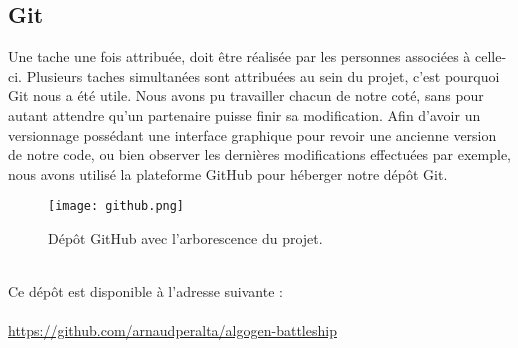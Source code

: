 \documentclass[12pt]{report}
\begin{document}
	\subsection{Git}
	Une tache une fois attribuée, doit être réalisée par les personnes associées à celle-ci. Plusieurs taches simultanées sont attribuées au sein du projet, c'est pourquoi Git nous a été utile. Nous avons pu travailler chacun de notre coté, sans pour autant attendre qu'un partenaire puisse finir sa modification. Afin d'avoir un versionnage possédant une interface graphique pour revoir une ancienne version de notre code, ou bien observer les dernières modifications effectuées par exemple, nous avons utilisé la plateforme GitHub pour héberger notre dépôt Git.
	\begin{figure}[h]
		\captionsetup{justification=centering}
    	\begin{center}
		\texttt{[image: github.png]}
		\caption{Dépôt GitHub avec l'arborescence du projet.}
		\end{center}
	\end{figure}
	\\Ce dépôt est disponible à l'adresse suivante :\\\\ \href{https://github.com/arnaudperalta/algogen-battleship}{https://github.com/arnaudperalta/algogen-battleship}
\newpage
{}
\end{document}
